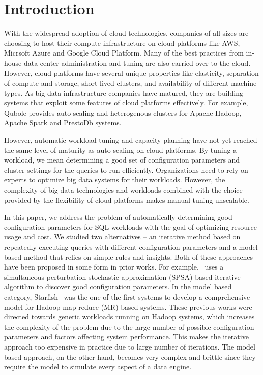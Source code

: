 \section{Introduction}

With the widespread adoption of cloud technologies, companies of all sizes are choosing to host their compute infrastructure on cloud platforms like AWS, Micrsoft Azure and Google Cloud Platform. 
Many of the best practices from in-house data center administration and tuning are also carried over to the cloud. However, cloud platforms have several unique properties like elasticity, separation of compute and storage, short lived clusters, and availability of different machine types. As big data infrastructure companies have matured, they are building systems that exploit some features of cloud platforms effectively. For example, Qubole provides auto-scaling 
and heterogenous clusters for Apache Hadoop, Apache Spark and PrestoDb systems. 

However, automatic workload tuning and capacity planning have not yet reached the same level of maturity as auto-scaling on cloud platforms. By tuning a workload, we mean determining a good set of configuration parameters and cluster settings for the queries to run efficiently. Organizations need to rely on experts to optimize big data systems for their workloads. However, the 
complexity of big data technologies and workloads combined with the choice provided by the flexibility of cloud platforms makes manual tuning unscalable. 

In this paper, we address the problem of automatically determining good configuration parameters for SQL workloads with the goal of optimizing resource usage and cost. We studied two alternatives -- an iterative method based on repeatedly executing queries with different configuration parameters and a model based method that relies on simple rules and insights. Both of these approaches have been proposed in some form in prior works. For example,~\cite{KumarPLPGB16} uses a simultaneous perturbation stochastic approximation (SPSA) based iterative algorithm to discover good configuration parameters. In the model based category, Starfish~\cite{herodotou2011profiling, herodotou2011starfish} was the one of the first systems to develop a comprehensive model for Hadoop map-reduce (MR) based systems. These previous works were directed towards generic workloads running on Hadoop systems, which increases the complexity of the problem due to the large number of possible configuration parameters and factors affecting system performance. This makes the iterative approach too expensive in practice due to large number of iterations. The model based approach, on the other hand, becomes very complex and brittle since they require the model to simulate every aspect of a data engine.


